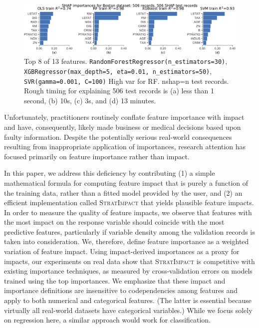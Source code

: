 \documentclass[11pt]{article}
\newcommand{\simp}{\fontfamily{cmr}\textsc{\small StratImpact}}
\begin{document}
\begin{figure}[htbp]
\begin{center}
\includegraphics[scale=0.6]{images/diff-models.pdf}
\caption{Top 8 of 13 features. {\tt\footnotesize RandomForestRegressor(n\_estimators=30)}, {\tt\footnotesize XGBRegressor(max\_depth=5, eta=0.01, n\_estimators=50)}, {\tt\footnotesize SVR(gamma=0.001, C=100)} High var for RF. nshap=n test records. Rough timing for explaining 506 test records is (a) less than 1 second, (b) 10s, (c) 3s, and (d) 13 minutes.}
\label{fig:diff-models}
\end{center}
\end{figure}

Unfortunately, practitioners routinely conflate feature importance with impact and have, consequently, likely made business or medical decisions based upon faulty information. Despite the potentially serious real-world consequences resulting from inappropriate application of importances, research attention has focused primarily on feature importance rather than impact. 

In this paper, we address this deficiency by contributing (1) a simple mathematical formula for computing feature impact that is purely a function of the training data, rather than a fitted model  provided by the user, and (2) an efficient implementation called \simp{} that yields plausible feature impacts.   In order to measure the quality of feature impacts, we observe that features with the most impact on the response variable should coincide with the most predictive features, particularly if variable density among the validation records is taken into consideration. We, therefore, define feature importance as a weighted variation of feature impact. Using impact-derived importances as a proxy for impacts, our experiments on real data show that \simp{} is competitive with existing importance techniques, as measured by cross-validation errors on models trained using the top importances.   We emphasize that these impact and importance definitions are insensitive to codependencies among features and apply to both numerical and categorical features.  (The latter is essential because virtually all real-world datasets have categorical variables.) While we focus solely on regression here, a similar approach would work for classification.
\end{document}
